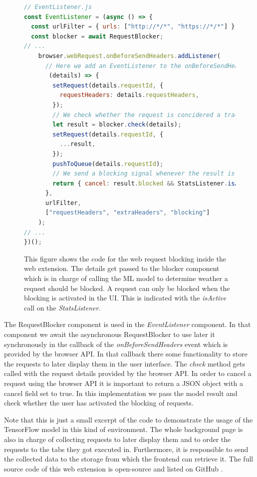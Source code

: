 \begin{figure}[ht!]
\begin{lstlisting}[language=JavaScript]
// EventListener.js
const EventListener = (async () => {
  const urlFilter = { urls: ["http://*/*", "https://*/*"] };
  const blocker = await RequestBlocker;
// ...
    browser.webRequest.onBeforeSendHeaders.addListener(
      // Here we add an EventListener to the onBeforeSendHeaders event.
       (details) => {
        setRequest(details.requestId, {
          requestHeaders: details.requestHeaders,
        });
        // We check whether the request is concidered a tracking request by passing all available information into the blocker component
        let result = blocker.check(details);
        setRequest(details.requestId, {
          ...result,
        });
        pushToQueue(details.requestId);
        // We send a blocking signal whenever the result is true and the blocking setting is active
        return { cancel: result.blocked && StatsListener.isActive() };
      },
      urlFilter,
      ["requestHeaders", "extraHeaders", "blocking"]
    );
// ...
})();
\end{lstlisting}
\caption{This figure shows the code for the web request blocking inside the web extension. The details get passed to the blocker component 
  which is in charge of calling the ML model to determine weather a request should be blocked. A request can only be blocked when the blocking is
  activated in the UI. This is indicated with the \emph{isActive} call on the \emph{StatsListener}.
}
\end{figure}

The RequestBlocker component is used in the \emph{EventListener} component. In that component we await the asynchronous RequestBlocker to 
use later it synchronously in the callback of the \emph{onBeforeSendHeaders} event which is provided by the browser API. In that callback there 
some functionality to store the requests to later display them in the user interface. The \emph{check} method gets called with the request details
provided by the browser API. In order to cancel a request using the browser API it is important to return a JSON object with a cancel field set
to true. In this implementation we pass the model result and check whether the user has activated the blocking of requests.

Note that this is just a small excerpt of the code to demonstrate the usage of the TensorFlow model in this kind of environment. The whole background page
is also in charge of collecting requests to later display them and to order the requests to the tabs they got executed in. Furthermore, it is 
responsible to send the collected data to the storage from which the frontend can retrieve it. The full source code of this web extension is open-source
and listed on GitHub \cite{trackingDetector}.
